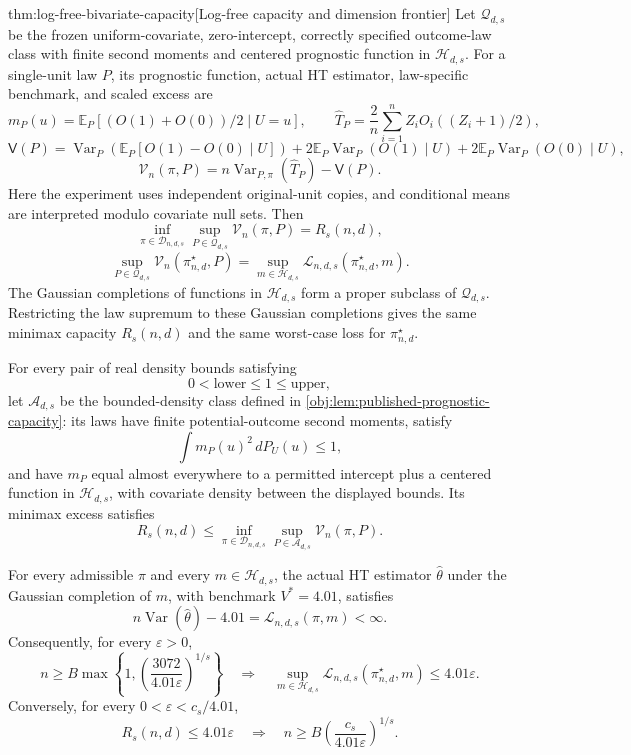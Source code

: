 \documentclass[11pt]{article}
\begin{document}
\begin{theoremv}{thm:log-free-bivariate-capacity}[Log-free capacity and dimension frontier]
Let \(\mathcal Q_{d,s}\) be the frozen uniform-covariate, zero-intercept, correctly specified outcome-law class with finite second moments and centered prognostic function in \(\mathcal H_{d,s}\). For a single-unit law \(P\), its prognostic function, actual HT estimator, law-specific benchmark, and scaled excess are
\[
m_P(u)=\mathbb E_P[(O(1)+O(0))/2\mid U=u],
\qquad
\widehat T_P=\frac2n\sum_{i=1}^n
 Z_iO_i((Z_i+1)/2),
\]
\[
\mathsf V(P)
=\operatorname{Var}_P\!\left(
 \mathbb E_P[O(1)-O(0)\mid U]\right)
+2\mathbb E_P\operatorname{Var}_P(O(1)\mid U)
+2\mathbb E_P\operatorname{Var}_P(O(0)\mid U),
\]
\[
\mathcal V_n(\pi,P)
=n\operatorname{Var}_{P,\pi}(\widehat T_P)-\mathsf V(P).
\]
Here the experiment uses independent original-unit copies, and conditional means are interpreted modulo covariate null sets. Then
\[
\inf_{\pi\in\mathcal D_{n,d,s}}
 \sup_{P\in\mathcal Q_{d,s}}\mathcal V_n(\pi,P)
=R_s(n,d),
\]
\[
\sup_{P\in\mathcal Q_{d,s}}
 \mathcal V_n(\pi^\star_{n,d},P)
=
\sup_{m\in\mathcal H_{d,s}}
 \mathcal L_{n,d,s}(\pi^\star_{n,d},m).
\]
The Gaussian completions of functions in \(\mathcal H_{d,s}\) form a proper subclass of \(\mathcal Q_{d,s}\). Restricting the law supremum to these Gaussian completions gives the same minimax capacity \(R_s(n,d)\) and the same worst-case loss for \(\pi^\star_{n,d}\).

For every pair of real density bounds satisfying
\[
0<\mathrm{lower}\leq1\leq\mathrm{upper},
\]
let \(\mathcal A_{d,s}\) be the bounded-density class defined in \cref{obj:lem:published-prognostic-capacity}: its laws have finite potential-outcome second moments, satisfy
\[
\int m_P(u)^2\,dP_U(u)\leq1,
\]
and have \(m_P\) equal almost everywhere to a permitted intercept plus a centered function in \(\mathcal H_{d,s}\), with covariate density between the displayed bounds. Its minimax excess satisfies
\[
R_s(n,d)
\leq
\inf_{\pi\in\mathcal D_{n,d,s}}
 \sup_{P\in\mathcal A_{d,s}}\mathcal V_n(\pi,P).
\]

For every admissible \(\pi\) and every \(m\in\mathcal H_{d,s}\), the actual HT estimator \(\widehat\theta\) under the Gaussian completion of \(m\), with benchmark \(V^*=4.01\), satisfies
\[
n\operatorname{Var}(\widehat\theta)-4.01
=\mathcal L_{n,d,s}(\pi,m)<\infty.
\]
Consequently, for every \(\varepsilon>0\),
\[
n\geq B\max\!\left\{
1,\left(\frac{3072}{4.01\varepsilon}\right)^{1/s}
\right\}
\quad\Longrightarrow\quad
\sup_{m\in\mathcal H_{d,s}}
 \mathcal L_{n,d,s}(\pi^\star_{n,d},m)
\leq4.01\varepsilon.
\]
Conversely, for every \(0<\varepsilon<c_s/4.01\),
\[
R_s(n,d)\leq4.01\varepsilon
\quad\Longrightarrow\quad
n\geq B\left(\frac{c_s}{4.01\varepsilon}\right)^{1/s}.
\]


\end{theoremv}
\end{document}
